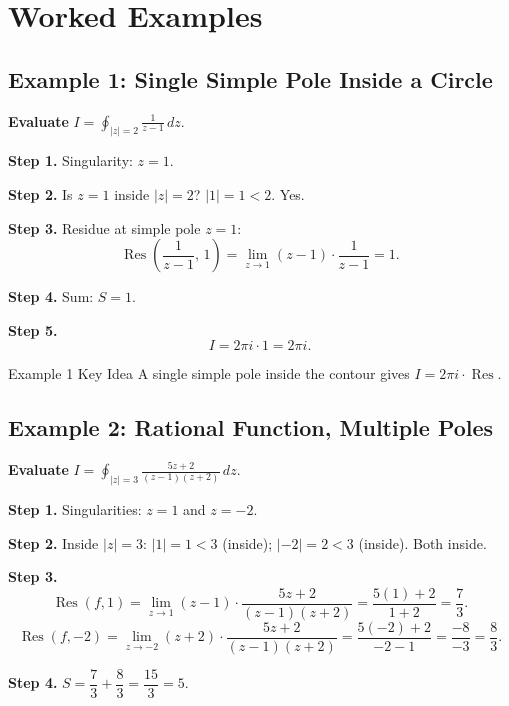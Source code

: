 \documentclass[12pt,a4paper]{article}
\begin{document}
\section{Worked Examples}

\subsection*{Example 1: Single Simple Pole Inside a Circle}

\textbf{Evaluate} $\displaystyle I = \oint_{|z|=2} \frac{1}{z-1}\,dz$.

\textbf{Step 1.} Singularity: $z = 1$.

\textbf{Step 2.} Is $z=1$ inside $|z|=2$? $|1|=1 < 2$. Yes.

\textbf{Step 3.} Residue at simple pole $z=1$:
\[
  \operatorname{Res}\!\left(\frac{1}{z-1},\,1\right)
  = \lim_{z\to 1}(z-1)\cdot\frac{1}{z-1} = 1.
\]

\textbf{Step 4.} Sum: $S = 1$.

\textbf{Step 5.}
\[
  I = 2\pi i \cdot 1 = \boxed{2\pi i}.
\]

\begin{learnbox}{Example 1 Key Idea}
A single simple pole inside the contour gives $I = 2\pi i \cdot \operatorname{Res}$.
\end{learnbox}

\subsection*{Example 2: Rational Function, Multiple Poles}

\textbf{Evaluate} $\displaystyle I = \oint_{|z|=3}
  \frac{5z+2}{(z-1)(z+2)}\,dz$.

\textbf{Step 1.} Singularities: $z=1$ and $z=-2$.

\textbf{Step 2.} Inside $|z|=3$: $|1|=1<3$ (inside); $|-2|=2<3$ (inside). Both inside.

\textbf{Step 3.}
\[
  \operatorname{Res}(f,1)
  = \lim_{z\to 1}(z-1)\cdot\frac{5z+2}{(z-1)(z+2)}
  = \frac{5(1)+2}{1+2} = \frac{7}{3}.
\]
\[
  \operatorname{Res}(f,-2)
  = \lim_{z\to -2}(z+2)\cdot\frac{5z+2}{(z-1)(z+2)}
  = \frac{5(-2)+2}{-2-1} = \frac{-8}{-3} = \frac{8}{3}.
\]

\textbf{Step 4.} $S = \dfrac{7}{3} + \dfrac{8}{3} = \dfrac{15}{3} = 5$.
\end{document}
